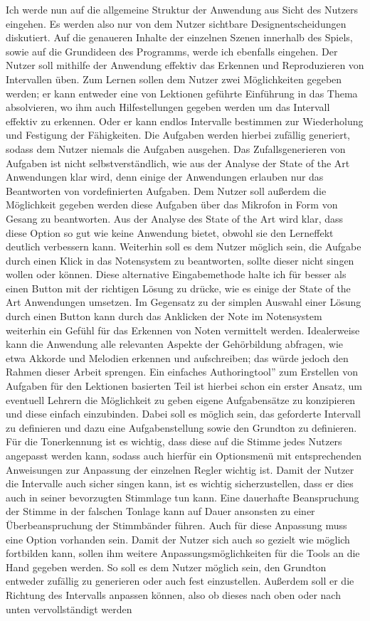 Ich werde nun auf die allgemeine Struktur der Anwendung aus Sicht des Nutzers eingehen. Es werden also nur von dem Nutzer sichtbare Designentscheidungen diskutiert. Auf die genaueren Inhalte der einzelnen Szenen innerhalb des Spiels, sowie auf die Grundideen des Programms, werde ich ebenfalls eingehen. Der Nutzer soll mithilfe der Anwendung effektiv das Erkennen und Reproduzieren von Intervallen üben. Zum Lernen sollen dem Nutzer zwei Möglichkeiten gegeben werden; er kann entweder eine von Lektionen geführte Einführung in das Thema absolvieren, wo ihm auch Hilfestellungen gegeben werden um das Intervall effektiv zu erkennen. Oder er kann endlos Intervalle bestimmen zur Wiederholung und Festigung der Fähigkeiten. Die Aufgaben werden hierbei zufällig generiert, sodass dem Nutzer niemals die Aufgaben ausgehen. Das Zufallsgenerieren von Aufgaben ist nicht selbstverständlich, wie aus der Analyse der State of the Art Anwendungen klar wird, denn einige der Anwendungen erlauben nur das Beantworten von vordefinierten Aufgaben. Dem Nutzer soll außerdem die Möglichkeit gegeben werden diese Aufgaben über das Mikrofon in Form von Gesang zu beantworten. Aus der Analyse des State of the Art wird klar, dass diese Option so gut wie keine Anwendung bietet, obwohl sie den Lerneffekt deutlich verbessern kann. Weiterhin soll es dem Nutzer möglich sein, die Aufgabe durch einen Klick in das Notensystem zu beantworten, sollte dieser nicht singen wollen oder können. Diese alternative Eingabemethode halte ich für besser als einen Button mit der richtigen Lösung zu drücke, wie es einige der State of the Art Anwendungen umsetzen. Im Gegensatz zu der simplen Auswahl einer Lösung durch einen Button kann durch das Anklicken der Note im Notensystem weiterhin ein Gefühl für das Erkennen von Noten vermittelt werden. Idealerweise kann die Anwendung alle relevanten Aspekte der Gehörbildung abfragen, wie etwa Akkorde und Melodien erkennen und aufschreiben; das würde jedoch den Rahmen dieser Arbeit sprengen. Ein einfaches \glqq Authoringtool'' zum Erstellen von Aufgaben für den Lektionen basierten Teil ist hierbei schon ein erster Ansatz, um eventuell Lehrern die Möglichkeit zu geben eigene Aufgabensätze zu konzipieren und diese einfach einzubinden. Dabei soll es möglich sein, das geforderte Intervall zu definieren und dazu eine Aufgabenstellung sowie den Grundton zu definieren. Für die Tonerkennung ist es wichtig, dass diese auf die Stimme jedes Nutzers angepasst werden kann, sodass auch hierfür ein Optionsmenü mit entsprechenden Anweisungen zur Anpassung der einzelnen Regler wichtig ist. Damit der Nutzer die Intervalle auch sicher singen kann, ist es wichtig sicherzustellen, dass er dies auch in seiner bevorzugten Stimmlage tun kann. Eine dauerhafte Beanspruchung der Stimme in der falschen Tonlage kann auf Dauer ansonsten zu einer Überbeanspruchung der Stimmbänder führen. Auch für diese Anpassung muss eine Option vorhanden sein. Damit der Nutzer sich auch so gezielt wie möglich fortbilden kann, sollen ihm weitere Anpassungsmöglichkeiten für die Tools an die Hand gegeben werden. So soll es dem Nutzer möglich sein, den Grundton entweder zufällig zu generieren oder auch fest einzustellen. Außerdem soll er die Richtung des Intervalls anpassen können, also ob dieses nach oben oder nach unten vervollständigt werden 